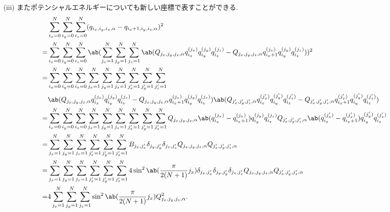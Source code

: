 \documentclass[uplatex,diffipdfmx,a4paper,11pt]{jlreq}
\theoremstyle{definition}
\begin{document}
(iii) またポテンシャルエネルギーについても新しい座標で表すことができる.
\begin{align}
    & \sum_{i_x=0}^{N}\sum_{i_y=0}^{N}\sum_{i_z=0}^{N}(q_{i_x,i_y,i_z,\alpha} - q_{i_x+1,i_y,i_z,\alpha})^2                                                                                                                                                                                                                                              \\
  = & \sum_{i_x=0}^{N}\sum_{i_y=0}^{N}\sum_{i_z=0}^{N}\ab(\sum_{j_x=1}^{N}\sum_{j_y=1}^{N}\sum_{j_z=1}^{N}\ab(Q_{j_x,j_y,j_z,\alpha}q_{i_x}^{(j_x)}q_{i_y}^{(j_y)}q_{i_z}^{(j_z)} - Q_{j_x,j_y,j_z,\alpha}q_{i_x+1}^{(j_x)}q_{i_y}^{(j_y)}q_{i_z}^{(j_z)}))^2                                                                                            \\
  = & \sum_{i_x=0}^{N}\sum_{i_y=0}^{N}\sum_{i_z=0}^{N}\sum_{j_x=1}^{N}\sum_{j_y=1}^{N}\sum_{j_z=1}^{N}\sum_{j_x'=1}^{N}\sum_{j_y'=1}^{N}\sum_{j_z'=1}^{N}                                                                                                                                                                                                \\
    & \ab(Q_{j_x,j_y,j_z,\alpha}q_{i_x}^{(j_x)}q_{i_y}^{(j_y)}q_{i_z}^{(j_z)} - Q_{j_x,j_y,j_z,\alpha}q_{i_x+1}^{(j_x)}q_{i_y}^{(j_y)}q_{i_z}^{(j_z)})\ab(Q_{j_x',j_y',j_z',\alpha}q_{i_x}^{(j_x')}q_{i_y}^{(j_y')}q_{i_z}^{(j_z')} - Q_{j_x',j_y',j_z',\alpha}q_{i_x+1}^{(j_x')}q_{i_y}^{(j_y')}q_{i_z}^{(j_z')})                                       \\
  = & \sum_{i_x=0}^{N}\sum_{i_y=0}^{N}\sum_{i_z=0}^{N}\sum_{j_x=1}^{N}\sum_{j_y=1}^{N}\sum_{j_z=1}^{N}\sum_{j_x'=1}^{N}\sum_{j_y'=1}^{N}\sum_{j_z'=1}^{N}Q_{j_x,j_y,j_z,\alpha}\ab(q_{i_x}^{(j_x)} - q_{i_x+1}^{(j_x)})q_{i_y}^{(j_y)}q_{i_z}^{(j_z)}Q_{j_x',j_y',j_z',\alpha}\ab(q_{i_x}^{(j_x')} - q_{i_x+1}^{(j_x')})q_{i_y}^{(j_y')}q_{i_z}^{(j_z')} \\
  = & \sum_{j_x=1}^{N}\sum_{j_y=1}^{N}\sum_{j_z=1}^{N}\sum_{j_x'=1}^{N}\sum_{j_y'=1}^{N}\sum_{j_z'=1}^{N}B_{j_x,j_x'}\delta_{j_y,j_y'}\delta_{j_z,j_z'}Q_{j_x,j_y,j_z,\alpha}Q_{j_x',j_y',j_z',\alpha}                                                                                                                                                   \\
  = & \sum_{j_x=1}^{N}\sum_{j_y=1}^{N}\sum_{j_z=1}^{N}\sum_{j_x'=1}^{N}\sum_{j_y'=1}^{N}\sum_{j_z'=1}^{N}4\sin^2\ab(\frac{\pi}{2(N+1)}j_x)\delta_{j_x,j_x'}\delta_{j_y,j_y'}\delta_{j_z,j_z'}Q_{j_x,j_y,j_z,\alpha}Q_{j_x',j_y',j_z',\alpha}                                                                                                             \\
  = & 4\sum_{j_x=1}^{N}\sum_{j_y=1}^{N}\sum_{j_z=1}^{N}\sin^2\ab(\frac{\pi}{2(N+1)}j_x)Q_{j_x,j_y,j_z,\alpha}^2.
\end{align}
\end{document}
